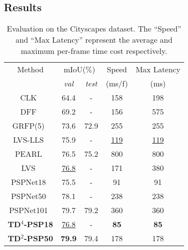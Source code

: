 \documentclass[10pt,twocolumn,letterpaper]{article}
\begin{document}
\subsection{Results}
\begin{table}
\centering
\begin{tabular}{ |c|cc|c|c|} 
\hline
Method             &\multicolumn{2}{c|}{mIoU($\%$)}       &Speed &Max Latency \\
                     &\textit{val} &\textit{test}    &(ms/f)   &(ms) \\
 \hline 
 \hline 
 \small{CLK~\cite{shelhamer2016clockwork} }             &64.4 &-    &158 &198\\ 
 \small{DFF~\cite{zhu2017deep}}                         &69.2 &-    &156 &575\\ 
 \small{GRFP(5)~\cite{nilsson2018semantic}}             &73.6 &72.9 &255 &255\\ 
 \small{LVS-LLS~\cite{li2018low}}                       &75.9 &-    &\underline{119} &\underline{119}\\
 \small{PEARL~\cite{jin2017video}}                      &76.5 &75.2 &800 &800 \\ 
 \small{LVS~\cite{li2018low}}                           &\underline{76.8} &-    &171 &380\\  
 \hline
 \small{PSPNet18~\cite{zhao2017pyramid}}                  &75.5 &-    &91  &91    \\
 \small{PSPNet50~\cite{zhao2017pyramid}}                  &78.1 &-    &238 &238   \\ 
 \small{PSPNet101~\cite{zhao2017pyramid}}                 &79.7 &79.2 &360 &360   \\ 
 \hline 
 \small{\textbf{TD$^4$-PSP18}}                             &\underline{76.8} &- &\textbf{85}  &\textbf{85}    \\ 
 \small{\textbf{TD$^2$-PSP50}}  &\textbf{79.9} &79.4 &178 &178   \\ 
 \hline 
\end{tabular}
\vspace{0.1cm}
\caption{\small{Evaluation on the Cityscapes dataset. The ``Speed'' and ``Max Latency'' represent the average and maximum per-frame time cost respectively.}}
\label{tab1}
\vspace{-0.5cm}
\end{table}
\end{document}

